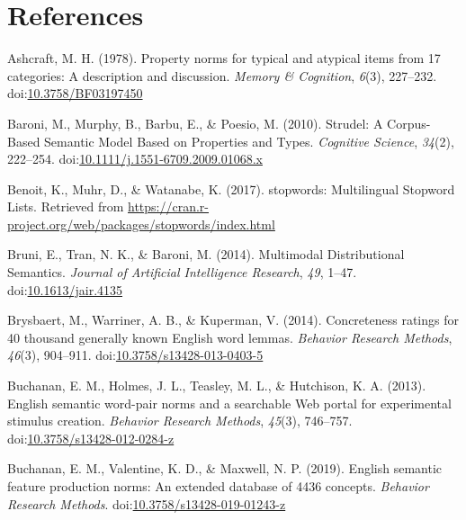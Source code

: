 \documentclass[man]{apa6}
\begin{document}
\newpage

\hypertarget{references}{%
\section{References}\label{references}}

\begingroup
\setlength{\parindent}{-0.5in}
\setlength{\leftskip}{0.5in}

\hypertarget{refs}{}
\leavevmode\hypertarget{ref-Ashcraft1978a}{}%
Ashcraft, M. H. (1978). Property norms for typical and atypical items from 17 categories: A description and discussion. \emph{Memory \& Cognition}, \emph{6}(3), 227--232. doi:\href{https://doi.org/10.3758/BF03197450}{10.3758/BF03197450}

\leavevmode\hypertarget{ref-Baroni2010}{}%
Baroni, M., Murphy, B., Barbu, E., \& Poesio, M. (2010). Strudel: A Corpus-Based Semantic Model Based on Properties and Types. \emph{Cognitive Science}, \emph{34}(2), 222--254. doi:\href{https://doi.org/10.1111/j.1551-6709.2009.01068.x}{10.1111/j.1551-6709.2009.01068.x}

\leavevmode\hypertarget{ref-Benoit2017}{}%
Benoit, K., Muhr, D., \& Watanabe, K. (2017). stopwords: Multilingual Stopword Lists. Retrieved from \url{https://cran.r-project.org/web/packages/stopwords/index.html}

\leavevmode\hypertarget{ref-Bruni2014}{}%
Bruni, E., Tran, N. K., \& Baroni, M. (2014). Multimodal Distributional Semantics. \emph{Journal of Artificial Intelligence Research}, \emph{49}, 1--47. doi:\href{https://doi.org/10.1613/jair.4135}{10.1613/jair.4135}

\leavevmode\hypertarget{ref-Brysbaert2014}{}%
Brysbaert, M., Warriner, A. B., \& Kuperman, V. (2014). Concreteness ratings for 40 thousand generally known English word lemmas. \emph{Behavior Research Methods}, \emph{46}(3), 904--911. doi:\href{https://doi.org/10.3758/s13428-013-0403-5}{10.3758/s13428-013-0403-5}

\leavevmode\hypertarget{ref-Buchanan2013}{}%
Buchanan, E. M., Holmes, J. L., Teasley, M. L., \& Hutchison, K. A. (2013). English semantic word-pair norms and a searchable Web portal for experimental stimulus creation. \emph{Behavior Research Methods}, \emph{45}(3), 746--757. doi:\href{https://doi.org/10.3758/s13428-012-0284-z}{10.3758/s13428-012-0284-z}

\leavevmode\hypertarget{ref-Buchanan2019}{}%
Buchanan, E. M., Valentine, K. D., \& Maxwell, N. P. (2019). English semantic feature production norms: An extended database of 4436 concepts. \emph{Behavior Research Methods}. doi:\href{https://doi.org/10.3758/s13428-019-01243-z}{10.3758/s13428-019-01243-z}
\end{document}
